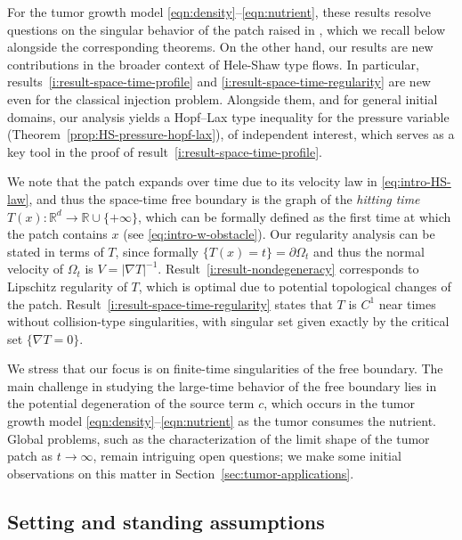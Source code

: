 \documentclass[11pt]{amsart}
\numberwithin{equation}{section}
\numberwithin{figure}{section}
\theoremstyle{plain}
\theoremstyle{definition}
\theoremstyle{remark}
\theoremstyle{plain}
\def\R{\mathbb{R}}
\begin{document}
For the tumor growth model \eqref{eqn:density}--\eqref{eqn:nutrient}, these results resolve questions on the singular behavior of the patch raised in
\cite{CJK25}, which we recall below alongside the corresponding theorems. On the other hand, our results are new contributions in the broader context of Hele-Shaw type flows. In particular, results~\ref{i:result-space-time-profile} and
\ref{i:result-space-time-regularity} are new even for the classical injection problem. Alongside them, and for general initial domains, our analysis yields a Hopf--Lax type inequality for the pressure variable (Theorem~\ref{prop:HS-pressure-hopf-lax}), of independent interest, which serves as a key tool in the proof of result~\ref{i:result-space-time-profile}.


We note that the patch expands over time due to its velocity law in \eqref{eq:intro-HS-law}, and thus the space-time free boundary is the graph of the {\it hitting time} $T(x):\R^d\to\R\cup\{+\infty\}$, which can be formally defined as the first time at which the patch contains $x$ (see \eqref{eq:intro-w-obstacle}). Our regularity analysis can be stated in terms of $T$, since formally $\{T(x)=t\}=\partial\Omega_t$ and thus the normal velocity of $\Omega_t$ is $V=|\nabla T|^{-1}$. Result~\ref{i:result-nondegeneracy} corresponds to Lipschitz regularity of $T$, which is optimal due to potential topological changes of the patch. Result~\ref{i:result-space-time-regularity} states that $T$ is $C^1$ near times without collision-type singularities, with singular set given exactly by the critical set $\{\nabla T=0\}$.





We stress that our focus is on finite-time singularities of the free boundary. The main challenge in studying the large-time behavior of the free boundary lies in the potential degeneration of the source term $c$, which occurs in the tumor growth model \eqref{eqn:density}--\eqref{eqn:nutrient} as the tumor consumes the nutrient. Global problems, such as the characterization of the limit shape of the tumor patch as $t\to\infty$, remain intriguing open questions; we make some initial observations on this matter in Section~\ref{sec:tumor-applications}.

\subsection{Setting and standing assumptions}\label{subsec:intro-setting}
\end{document}
